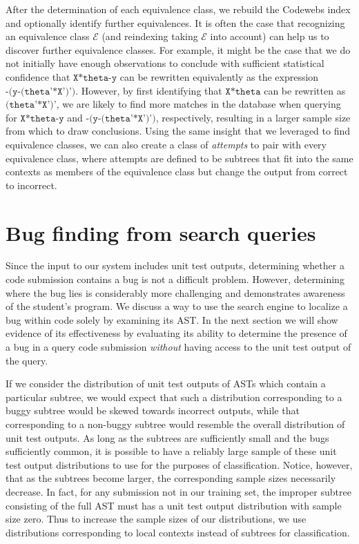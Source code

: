After the determination of each equivalence class, we rebuild the Codewebs index and optionally
identify further equivalences.  It is often the case that recognizing an equivalence class  $\mathcal{E}$ (and reindexing 
taking $\mathcal{E}$ into account) can help us to discover further equivalence classes.
For example, it might be the case that we do not 
initially have enough observations to conclude with sufficient statistical confidence that 
$\texttt{X*theta-y}$ can be rewritten equivalently as the expression $\texttt{-(y-(theta'*X')')}$.
However, by first identifying that $\texttt{X*theta}$ can be rewritten as $\texttt{(theta'*X')'}$, 
we are likely to find more matches in the database when querying for $\texttt{X*theta-y}$ and $\texttt{-(y-(theta'*X')')}$, respectively,
resulting in a larger sample size from which to draw conclusions.
Using the same insight that we leveraged to find equivalence classes, we can also create a class of \emph{attempts} 
to pair with every equivalence class, where attempts are defined to be
subtrees that fit into the same contexts as members of the equivalence class but change the output from correct to incorrect.

\section{Bug finding from search queries}
Since the input to our system includes unit test outputs, determining whether a code submission contains a bug is not a difficult problem.  However, determining where the bug lies is considerably more challenging and demonstrates awareness of the student's program.  We discuss a way to use the search engine to localize a bug within code solely by examining its AST.  In the next section we will show evidence of its effectiveness by evaluating its ability to determine the presence of a bug in a query code submission \emph{without} having access to the unit test output of the query.

If we consider the distribution of unit test outputs of ASTs which contain a particular subtree, we would expect that such a distribution corresponding to a buggy subtree would be skewed towards incorrect outputs, while that corresponding to a non-buggy subtree would resemble the overall distribution of unit test outputs.  
As long as the subtrees are sufficiently small and the bugs sufficiently common, it is possible to have a reliably large sample of these unit test
output distributions to use for the purposes of classification. Notice, however, that as the subtrees become larger, the corresponding sample sizes necessarily decrease.  In fact, for any submission not in our training set, the improper subtree consisting of the full AST must has a unit test output distribution with sample size zero.  Thus to increase the sample sizes of our distributions, we use distributions corresponding to local contexts instead of subtrees for classification.


